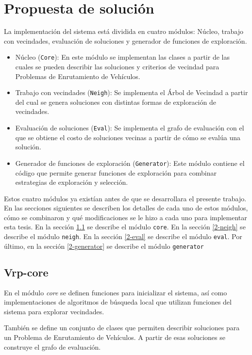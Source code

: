 \chapter{Propuesta de solución}\label{chapter:Solution}

La implementación del sistema está dividida en cuatro módulos: Núcleo, trabajo con vecindades, evaluación de soluciones y generador de funciones de exploración.

\begin{itemize}
	\item Núcleo (\texttt{Core}): En este módulo se implementan las clases a partir de las cuales se pueden describir las soluciones y criterios de vecindad para Problemas de Enrutamiento de Vehículos.
	\item Trabajo con vecindades (\texttt{Neigh}): Se implementa el Árbol de Vecindad a partir del cual se genera soluciones con distintas formas de exploración de vecindades.
	\item Evaluación de soluciones (\texttt{Eval}): Se implementa el grafo de evaluación con el que se obtiene el costo de soluciones vecinas a partir de cómo se evalúa una solución.
	\item Generador de funciones de exploración (\texttt{Generator}): Este módulo contiene el código que permite generar funciones de exploración para combinar estrategias de exploración y selección.
\end{itemize}

Estos cuatro módulos ya existían antes de que se desarrollara el presente trabajo. En las secciones siguientes se describen los detalles de cada uno de estos módulos, cómo se combinaron y qué modificaciones se le hizo a cada uno para implementar esta tesis. En la sección \ref{2-core} se describe el módulo \texttt{core}. En la sección \ref{2-neigh} se describe el módulo \texttt{neigh}. En la sección \ref{2-eval} se describe el módulo \texttt{eval}. Por último, en la sección \ref{2-generator} se describe el módulo \texttt{generator}

\section{Vrp-core}\label{2-core}

En el módulo \textit{core} se definen funciones para inicializar el sistema, así como implementaciones de algoritmos de búsqueda local que utilizan funciones del sistema para explorar vecindades.

También se define un conjunto de clases que permiten describir soluciones para un Problema de Enrutamiento de Vehículos. A partir de esas soluciones se construye el grafo de evaluación.

